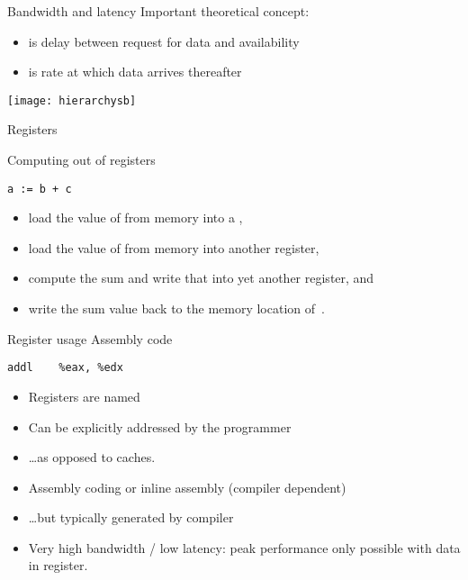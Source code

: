 \begin{frame}{Bandwidth and latency}
  Important theoretical concept:
  \begin{itemize}
  \item {} is delay between request for data and availability
  \item {} is rate at which data arrives thereafter
  \end{itemize}
\end{frame}

\begin{frame}
  \texttt{[image: hierarchysb]}  
\end{frame}

 {Registers}

\begin{frame}[fragile]{Computing out of registers}
\begin{verbatim}
a := b + c
\end{verbatim}
\begin{itemize}
\item load the value of  from memory into a ,
\item load the value of  from memory into another register,
\item compute the sum and write that into yet another register, and
\item write the sum value back to the memory location of~.
\end{itemize}
\end{frame}

\begin{frame}[fragile]{Register usage}
Assembly code
\begin{verbatim}
addl	%eax, %edx
\end{verbatim}  
\begin{itemize}
\item Registers are named
\item Can be explicitly addressed by the programmer
\item \ldots as opposed to caches.
\item Assembly coding or inline assembly (compiler dependent)
\item \ldots but typically generated by compiler
\item Very high bandwidth / low latency: peak performance only possible with
data in register.
\end{itemize}
\end{frame}

